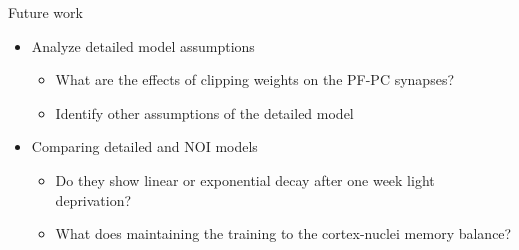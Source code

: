 \documentclass[ignorenonframetext,]{beamer}
\begin{document}
\begin{frame}{Future work}

\begin{itemize}
\itemsep1pt\parskip0pt
\item
  Analyze detailed model assumptions

  \begin{itemize}
  \itemsep1pt\parskip0pt
  \item
    What are the effects of clipping weights on the PF-PC synapses?
  \item
    Identify other assumptions of the detailed model
  \end{itemize}
\item
  Comparing detailed and NOI models

  \begin{itemize}
  \itemsep1pt\parskip0pt
  \item
    Do they show linear or exponential decay after one week light
    deprivation?
  \item
    What does maintaining the training to the cortex-nuclei memory
    balance?
  \end{itemize}
\end{itemize}

\end{frame}
\end{document}
